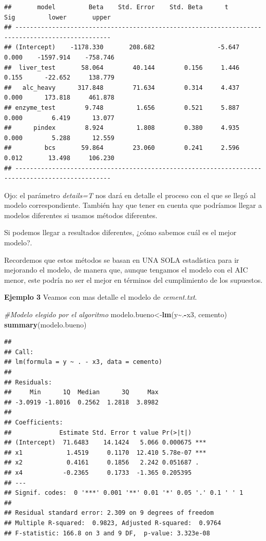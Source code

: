 \documentclass[
]{book}
\newenvironment{Shaded}{\begin{snugshade}}{\end{snugshade}}
\newcommand{\CommentTok}[1]{\textcolor[rgb]{0.56,0.35,0.01}{\textit{#1}}}
\newcommand{\FunctionTok}[1]{\textcolor[rgb]{0.13,0.29,0.53}{\textbf{#1}}}
\newcommand{\NormalTok}[1]{#1}
\newcommand{\OtherTok}[1]{\textcolor[rgb]{0.56,0.35,0.01}{#1}}
\newcommand{\SpecialCharTok}[1]{\textcolor[rgb]{0.81,0.36,0.00}{\textbf{#1}}}
\begin{document}
\begin{verbatim}
##       model         Beta    Std. Error    Std. Beta      t        Sig         lower       upper 
## ------------------------------------------------------------------------------------------------
## (Intercept)    -1178.330       208.682                 -5.647    0.000    -1597.914    -758.746 
##  liver_test       58.064        40.144        0.156     1.446    0.155      -22.652     138.779 
##   alc_heavy      317.848        71.634        0.314     4.437    0.000      173.818     461.878 
## enzyme_test        9.748         1.656        0.521     5.887    0.000        6.419      13.077 
##      pindex        8.924         1.808        0.380     4.935    0.000        5.288      12.559 
##         bcs       59.864        23.060        0.241     2.596    0.012       13.498     106.230 
## ------------------------------------------------------------------------------------------------
\end{verbatim}

Ojo: el parámetro \emph{details=T} nos dará en detalle el proceso con el que se llegó al modelo correspondiente. También hay que tener en cuenta que podríamos llegar a modelos diferentes si usamos métodos diferentes.

Si podemos llegar a resultados diferentes, ¿cómo sabemos cuál es el mejor modelo?.

Recordemos que estos métodos se basan en UNA SOLA estadística para ir mejorando el modelo, de manera que, aunque tengamos el modelo con el AIC menor, este podría no ser el mejor en términos del cumplimiento de los supuestos.

\textbf{Ejemplo 3} Veamos con mas detalle el modelo de \emph{cement.txt}.

\begin{Shaded}
\begin{Highlighting}[]
\CommentTok{\#Modelo elegido por el algoritmo}
\NormalTok{modelo.bueno}\OtherTok{\textless{}{-}}\FunctionTok{lm}\NormalTok{(y}\SpecialCharTok{\textasciitilde{}}\NormalTok{.}\SpecialCharTok{{-}}\NormalTok{x3, cemento)}
\FunctionTok{summary}\NormalTok{(modelo.bueno)}
\end{Highlighting}
\end{Shaded}

\begin{verbatim}
## 
## Call:
## lm(formula = y ~ . - x3, data = cemento)
## 
## Residuals:
##     Min      1Q  Median      3Q     Max 
## -3.0919 -1.8016  0.2562  1.2818  3.8982 
## 
## Coefficients:
##             Estimate Std. Error t value Pr(>|t|)    
## (Intercept)  71.6483    14.1424   5.066 0.000675 ***
## x1            1.4519     0.1170  12.410 5.78e-07 ***
## x2            0.4161     0.1856   2.242 0.051687 .  
## x4           -0.2365     0.1733  -1.365 0.205395    
## ---
## Signif. codes:  0 '***' 0.001 '**' 0.01 '*' 0.05 '.' 0.1 ' ' 1
## 
## Residual standard error: 2.309 on 9 degrees of freedom
## Multiple R-squared:  0.9823, Adjusted R-squared:  0.9764 
## F-statistic: 166.8 on 3 and 9 DF,  p-value: 3.323e-08
\end{verbatim}
\end{document}
